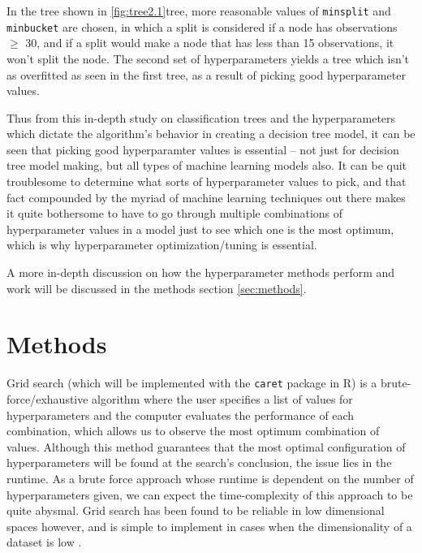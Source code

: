 \documentclass[12pt]{article}
\begin{document}
In the tree shown in \ref{fig:tree2.1}tree, more reasonable values of
\texttt{minsplit} and \texttt{minbucket} are chosen, in which a split is
considered if a node has observations \(\ge\) 30, and if a split would
make a node that has less than 15 observations, it won't split the node.
The second set of hyperparameters yields a tree which isn't as
overfitted as seen in the first tree, as a result of picking good
hyperparameter values.

Thus from this in-depth study on classification trees and the
hyperparameters which dictate the algorithm's behavior in creating a
decision tree model, it can be seen that picking good hyperparamter
values is essential -- not just for decision tree model making, but all
types of machine learning models also. It can be quit troublesome to
determine what sorts of hyperparameter values to pick, and that fact
compounded by the myriad of machine learning techniques out there makes
it quite bothersome to have to go through multiple combinations of
hyperparameter values in a model just to see which one is the most
optimum, which is why hyperparameter optimization/tuning is essential.

A more in-depth discussion on how the hyperparameter methods perform and
work will be discussed in the methods section \ref{sec:methods}.

\newpage

\hypertarget{methods}{%
\section{Methods}\label{methods}}

\label{sec:methods}

Grid search (which will be implemented with the \texttt{caret} package
in R) is a brute-force/exhaustive algorithm where the user specifies a
list of values for hyperparameters and the computer evaluates the
performance of each combination, which allows us to observe the most
optimum combination of values. Although this method guarantees that the
most optimal configuration of hyperparameters will be found at the
search's conclusion, the issue lies in the runtime. As a brute force
approach whose runtime is dependent on the number of hyperparameters
given, we can expect the time-complexity of this approach to be quite
abysmal. Grid search has been found to be reliable in low dimensional
spaces however, and is simple to implement in cases when the
dimensionality of a dataset is low \citep{Bergstra2012}.
\end{document}
